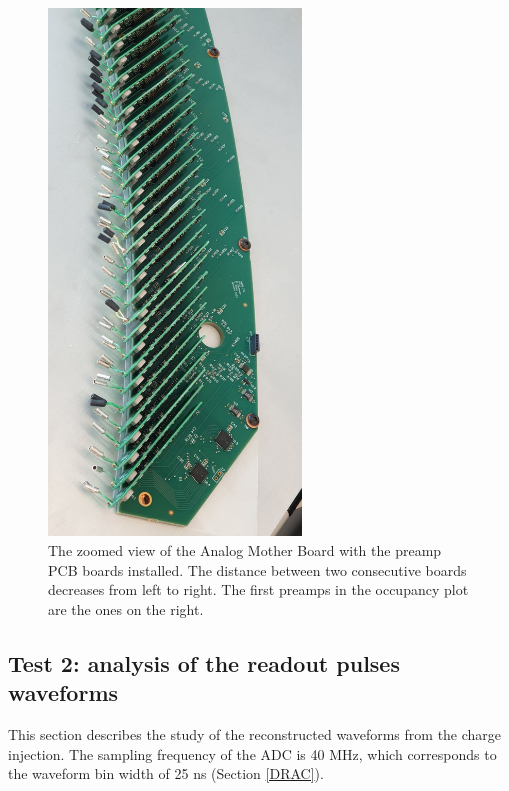 \begin{figure}[!h]
  \centering
  \includegraphics[angle=90,width=0.6\textwidth]{figures/jpg/photo_6028424923279639562_y.jpg}
  \caption[The zoomed view of the Analog Mother Board with the 
  preamp boards installed.]{The zoomed view of the Analog Mother Board with the 
  preamp PCB boards installed. The distance between 
  two consecutive boards decreases from left to right. 
  The first preamps in the occupancy plot are the ones on the right.}
 \label{fig:spacepreamps}
\end{figure}

\subsection{Test 2: analysis of the readout pulses waveforms}\label{wf}
This section describes the study of the reconstructed waveforms from the charge injection.
The sampling frequency of the ADC is 40 MHz, which corresponds to the waveform bin width of 25 ns (Section \ref{DRAC}). 

